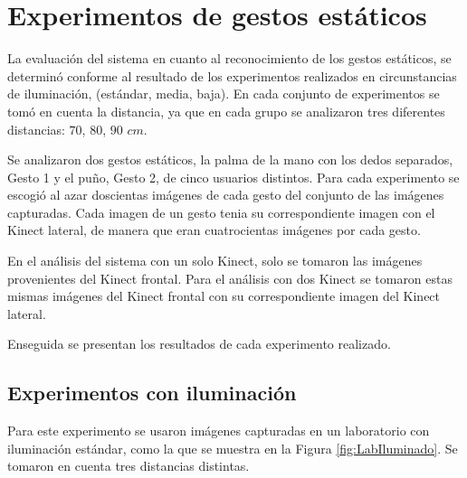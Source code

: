 

\section{Experimentos de gestos estáticos}\label{TestStaticGestures}  

La evaluación del sistema en cuanto al reconocimiento de los gestos estáticos, se determin\'o conforme al resultado de los experimentos realizados en circunstancias de iluminación, (estándar, media, baja). En cada conjunto de experimentos se tom\'o en cuenta la distancia, ya que en cada grupo se analizaron tres diferentes distancias: $70$, $80$, $90$ $cm$.  

Se analizaron dos gestos estáticos, la palma de la mano con los dedos separados, Gesto 1 y el puño, Gesto 2, de cinco usuarios distintos. Para cada experimento se escogió al azar doscientas imágenes de cada gesto del conjunto de las imágenes capturadas. Cada imagen de un gesto tenia su correspondiente imagen con el Kinect lateral, de manera que eran cuatrocientas imágenes por cada gesto. 

En el análisis del sistema con un solo Kinect, solo se tomaron las imágenes provenientes del Kinect frontal. Para el análisis con dos Kinect se tomaron estas mismas imágenes del Kinect frontal con su correspondiente imagen del Kinect lateral.

Enseguida se presentan los resultados de cada experimento realizado.


\subsection{Experimentos con iluminación} 
Para este experimento se usaron imágenes capturadas en un laboratorio con iluminación estándar, como la que se muestra en la Figura \ref{fig:LabIluminado}. Se tomaron en cuenta tres distancias distintas. 

